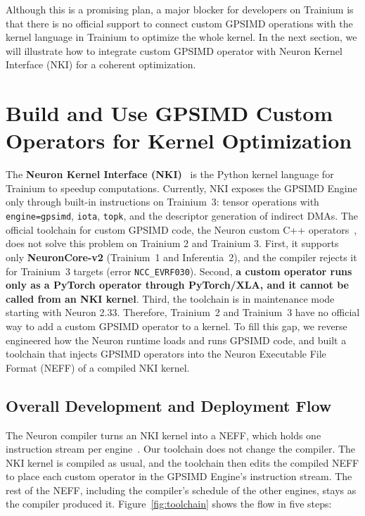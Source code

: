 \documentclass{article}
\newcommand{\code}[1]{\texttt{#1}}
\begin{document}
Although this is a promising plan, a major blocker for developers on Trainium is that there is no official support to connect custom GPSIMD operations with the kernel language in Trainium to optimize the whole kernel. In the next section, we will illustrate how to integrate custom GPSIMD operator with Neuron Kernel Interface (NKI) for a coherent optimization.

\section{Build and Use GPSIMD Custom Operators for Kernel Optimization}
\label{sec:toolchain}

The \textbf{Neuron Kernel Interface (NKI)}~\citep{nki_about} is the Python kernel language for Trainium to speedup computations. Currently, NKI exposes the GPSIMD Engine only through built-in instructions on Trainium~3: tensor operations with \code{engine=gpsimd}, \code{iota}, \code{topk}, and the descriptor generation of indirect DMAs. The official toolchain for custom GPSIMD code, the Neuron custom C++ operators~\citep{neuron_customops}, does not solve this problem on Trainium 2 and Trainium 3. First, it supports only \textbf{NeuronCore-v2} (Trainium~1 and Inferentia~2), and the compiler rejects it for Trainium~3 targets (error \code{NCC\_EVRF030}). Second, \textbf{a custom operator runs only as a PyTorch operator through PyTorch/XLA, and it cannot be called from an NKI kernel}. Third, the toolchain is in maintenance mode starting with Neuron 2.33. Therefore, Trainium~2 and Trainium~3 have no official way to add a custom GPSIMD operator to a kernel. To fill this gap, we reverse engineered how the Neuron runtime loads and runs GPSIMD code, and built a toolchain that injects GPSIMD operators into the Neuron Executable File Format (NEFF) of a compiled NKI kernel.

\subsection{Overall Development and Deployment Flow}
\label{sec:flow}

The Neuron compiler turns an NKI kernel into a NEFF, which holds one instruction stream per engine~\citep{neff_doc}. Our toolchain does not change the compiler. The NKI kernel is compiled as usual, and the toolchain then edits the compiled NEFF to place each custom operator in the GPSIMD Engine's instruction stream. The rest of the NEFF, including the compiler's schedule of the other engines, stays as the compiler produced it. Figure~\ref{fig:toolchain} shows the flow in five steps:
\end{document}
